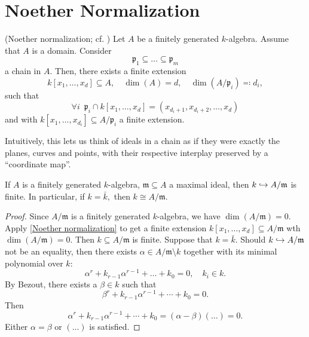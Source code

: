 \section{Noether Normalization}

\begin{theorem}(Noether normalization; cf. \cite[\S 13]{eisenbud1995commutative})
  \label{Noether normalization}
  Let \(A\) be a finitely generated \(k\)-algebra. Assume that \(A\) is a domain.
  Consider
  \[\mathfrak p_1 \subseteq \dotsc \subseteq \mathfrak p_m\]
  a chain in \(A.\)
  Then, there exists a finite extension
  \[k[x_1, \dotsc, x_d] \subseteq A, \quad \dim(A) = d, \quad \dim(A/{\mathfrak p_i}) \eqqcolon d_i,\]
  such that
  \[\forall i \enspace \mathfrak p_i \cap k[x_1, \dotsc, x_d] = (x_{d_i+1}, x_{d_i+2}, \dotsc, x_d)\]
  and with
  \(k[x_1, \dotsc, x_{d_i}] \subseteq A/{\mathfrak p_i}\)
  a finite extension.
\end{theorem}

Intuitively, this lets us think of ideals in a chain as if they were exactly the planes, curves and points, with their respective interplay preserved by a ``coordinate map''.

\begin{theorem}
  \label{weak Nullstellensatz}
  If \(A\) is a finitely generated \(k\)-algebra, \(\mathfrak m \subseteq A\) a maximal ideal, then
  \(k \hookrightarrow A/{\mathfrak m}\)
  is finite.
  In particular, if \(k = \bar k,\) then \(k \cong A/{\mathfrak m}.\)
\end{theorem}
\begin{proof}
  Since \(A/{\mathfrak m}\) is a finitely generated \(k\)-algebra, we have
  \(\dim(A/{\mathfrak m}) = 0.\)
  Apply \cref{Noether normalization} to get a finite extension
  \(k[x_1, \dotsc, x_d] \subseteq A/{\mathfrak m}\)
  wth \(\dim(A/{\mathfrak m}) = 0.\)
  Then
  \(k \subseteq A/{\mathfrak m}\)
  is finite.
  Suppose that \(k = \bar k.\) Should \(k \hookrightarrow A/{\mathfrak m}\) not be an equality, then there exists
  \(\alpha \in A/{\mathfrak m} \setminus k\)
  together with its minimal polynomial over \(k:\)
  \[\alpha^r + k_{r-1} \alpha^{r-1} + \dotsc + k_0 = 0, \quad k_i \in k.\]
  By Bezout, there exists a \(\beta \in k\) such that
  \[\beta^r + k_{r-1} \alpha^{r-1} + \dotsb + k_0 = 0.\]
  Then
  \[ \alpha^r + k_{r-1} \alpha^{r-1} + \dotsb + k_0 = (\alpha - \beta)(\dotso) = 0.\]
  Either \(\alpha = \beta\) or \((\dotso)\) is satisfied.
\end{proof}


